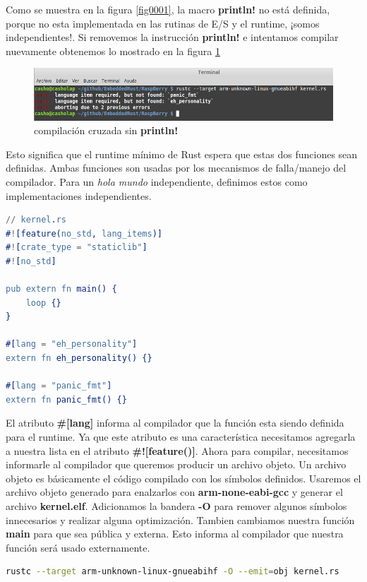 \documentclass[12pt, twoside]{report}
\begin{document}
Como se muestra en la figura \ref{fig0001}, la macro \textbf{println!} no está definida, porque no esta implementada en las rutinas de E/S y el runtime, ¡somos independientes!. Si removemos la instrucción \textbf{println!} e intentamos compilar nuevamente obtenemos lo mostrado en la figura \ref{fig0002}

\begin{figure}
	\centering	\includegraphics[width=1\linewidth]{rust_kernel2.png}
	\caption{compilación cruzada sin \textbf{println!}}
	\label{fig0002}
\end{figure}

Esto significa que el runtime mínimo de Rust espera que estas dos funciones sean definidas. Ambas funciones son usadas por los mecanismos de falla/manejo del compilador. Para un \textit{hola mundo} independiente, definimos estos como implementaciones independientes.

\begin{lstlisting}[language=erlang]
// kernel.rs
#![feature(no_std, lang_items)]
#![crate_type = "staticlib"]
#![no_std]

pub extern fn main() {  
    loop {}
}

#[lang = "eh_personality"]
extern fn eh_personality() {}

#[lang = "panic_fmt"]
extern fn panic_fmt() {}  
\end{lstlisting}

El atributo \textbf{\#[lang]} informa al compilador que la función esta siendo definida para el runtime. Ya que este atributo es una característica necesitamos agregarla a nuestra lista en el atributo \textbf{\#![feature()]}. Ahora para compilar, necesitamos informarle al compilador que queremos producir un archivo objeto. Un archivo objeto es básicamente el código compilado con los símbolos definidos. Usaremos el archivo objeto generado para enalzarlos con \textbf{arm-none-eabi-gcc} y generar el archivo \textbf{kernel.elf}. Adicionamos la bandera \textbf{-O} para remover algunos símbolos innecesarios y realizar alguna optimización. Tambien cambiamos nuestra función \textbf{main} para que sea pública y externa.  Esto informa al compilador que nuestra función será usado externamente.
\begin{lstlisting}[language=bash]
rustc --target arm-unknown-linux-gnueabihf -O --emit=obj kernel.rs
\end{lstlisting}
\end{document}
